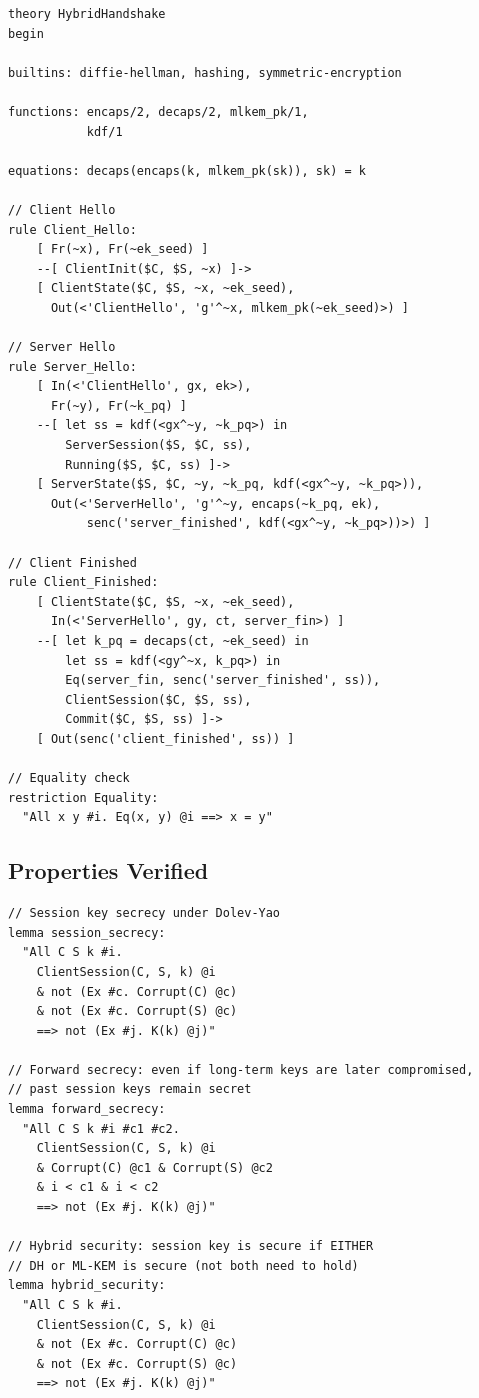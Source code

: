 \documentclass[11pt,a4paper]{article}
\begin{document}
\begin{lstlisting}[language=Tamarin,caption={Hybrid handshake in Tamarin}]
theory HybridHandshake
begin

builtins: diffie-hellman, hashing, symmetric-encryption

functions: encaps/2, decaps/2, mlkem_pk/1,
           kdf/1

equations: decaps(encaps(k, mlkem_pk(sk)), sk) = k

// Client Hello
rule Client_Hello:
    [ Fr(~x), Fr(~ek_seed) ]
    --[ ClientInit($C, $S, ~x) ]->
    [ ClientState($C, $S, ~x, ~ek_seed),
      Out(<'ClientHello', 'g'^~x, mlkem_pk(~ek_seed)>) ]

// Server Hello
rule Server_Hello:
    [ In(<'ClientHello', gx, ek>),
      Fr(~y), Fr(~k_pq) ]
    --[ let ss = kdf(<gx^~y, ~k_pq>) in
        ServerSession($S, $C, ss),
        Running($S, $C, ss) ]->
    [ ServerState($S, $C, ~y, ~k_pq, kdf(<gx^~y, ~k_pq>)),
      Out(<'ServerHello', 'g'^~y, encaps(~k_pq, ek),
           senc('server_finished', kdf(<gx^~y, ~k_pq>))>) ]

// Client Finished
rule Client_Finished:
    [ ClientState($C, $S, ~x, ~ek_seed),
      In(<'ServerHello', gy, ct, server_fin>) ]
    --[ let k_pq = decaps(ct, ~ek_seed) in
        let ss = kdf(<gy^~x, k_pq>) in
        Eq(server_fin, senc('server_finished', ss)),
        ClientSession($C, $S, ss),
        Commit($C, $S, ss) ]->
    [ Out(senc('client_finished', ss)) ]

// Equality check
restriction Equality:
  "All x y #i. Eq(x, y) @i ==> x = y"
\end{lstlisting}

\subsection{Properties Verified}

\begin{lstlisting}[language=Tamarin,caption={Hybrid handshake security properties}]
// Session key secrecy under Dolev-Yao
lemma session_secrecy:
  "All C S k #i.
    ClientSession(C, S, k) @i
    & not (Ex #c. Corrupt(C) @c)
    & not (Ex #c. Corrupt(S) @c)
    ==> not (Ex #j. K(k) @j)"

// Forward secrecy: even if long-term keys are later compromised,
// past session keys remain secret
lemma forward_secrecy:
  "All C S k #i #c1 #c2.
    ClientSession(C, S, k) @i
    & Corrupt(C) @c1 & Corrupt(S) @c2
    & i < c1 & i < c2
    ==> not (Ex #j. K(k) @j)"

// Hybrid security: session key is secure if EITHER
// DH or ML-KEM is secure (not both need to hold)
lemma hybrid_security:
  "All C S k #i.
    ClientSession(C, S, k) @i
    & not (Ex #c. Corrupt(C) @c)
    & not (Ex #c. Corrupt(S) @c)
    ==> not (Ex #j. K(k) @j)"
\end{lstlisting}
\end{document}

